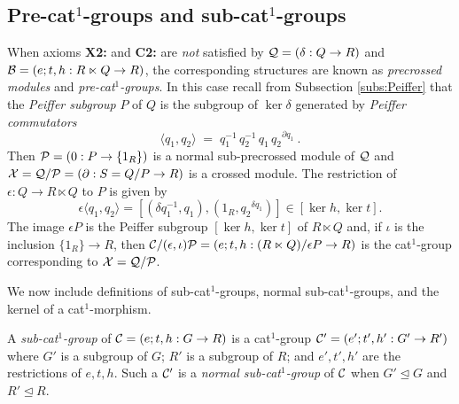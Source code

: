\subsection{Pre-cat$^1$-groups and sub-cat$^1$-groups} \label{subs:precat1}

When axioms \textbf{X2:} and \textbf{C2:} are \emph{not} satisfied
by  $\mathcal{Q} = (\delta : Q \to R)$  and  
$\mathcal{B} = (e;t,h : R \ltimes Q \to R)$,
the corresponding structures are known as \emph{precrossed modules}
and \emph{pre-cat$^1$-groups}.
In this case recall from Subsection \ref{subs:Peiffer}
that the \emph{Peiffer subgroup}  $P$  of  $Q$  is the subgroup of
$\ker\delta$  generated by \emph{Peiffer commutators}
$$
\langle q_1, q_2 \rangle 
\;=\; 
q_1^{-1}\,q_2^{-1}\,q_1\,{q_2}^{\partial q_1}~.
$$
Then  $\mathcal{P} = (0 : P \to \{1_R\})$  
is a normal sub-precrossed module of  $\mathcal{Q}$  and  
$\mathcal{X} = \mathcal{Q}/\mathcal{P} = (\partial : S=Q/P \to R)$  is a crossed module.
The restriction of  $\epsilon : Q \to R \ltimes Q$  to  $P$  is given by
$$
   \epsilon \langle q_1, q_2 \rangle
 = [ (\delta q_1^{-1}, q_1), (1_R, {q_2}^{\delta q_1}) ]
 \in  [ \ker h, \ker t ].
$$
The image  $\epsilon P$  is the Peiffer subgroup
$[\ker h, \ker t]$  of  $R \ltimes Q$
and, if  $\iota$  is the inclusion  $\{ 1_R \} \to R$,  then
$\mathcal{C}/(\epsilon,\iota)\mathcal{P} = 
 (e;t,h : (R \ltimes Q) / \epsilon P \to R)$
is the cat$^1$-group corresponding to  $\mathcal{X} = \mathcal{Q}/\mathcal{P}$.


\bigskip
We now include definitions of sub-cat$^1$-groups, 
normal sub-cat$^1$-groups, and the kernel of a cat$^1$-morphism. 

A \emph{sub-cat$^1$-group} of $\mathcal{C} = (e;t,h : G \to R)$ 
is a cat$^1$-group $\mathcal{C}' = (e';t',h' : G' \to R')$ where 
$G'$ is a subgroup of $G$; $R'$ is a subgroup of $R$; 
and $e',t',h'$ are the restrictions of $e,t,h$. 
Such a $\mathcal{C}'$ is a \emph{normal sub-cat$^1$-group} of $\mathcal{C}$ 
when $G' \unlhd G$ and $R' \unlhd R$. 

